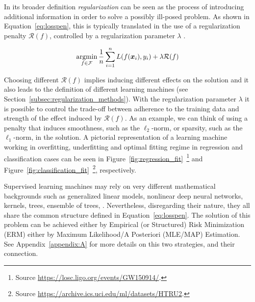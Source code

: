	    In its broader definition \textit{regularization} can be seen as the process of introducing additional information in order to solve a possibly ill-posed problem.
			As shown in Equation~\eqref{eq:losspen}, this is typically translated in the use of a regularization penalty $\mathcal{R}(f)$, controlled by a regularization parameter $\lambda$ \cite{tikhonov1963solution, evgeniou2000regularization}.

	     \begin{equation}\label{eq:losspen}
	    	\mathop{\mathrm{argmin}}\limits_{f \in \mathcal{F}} \frac{1}{n}\sum_{i=1}^n L(f(\bm{x}_i),y_i) + \lambda \mathcal{R}(f)
	    \end{equation}

			Choosing different $\mathcal{R}(f)$ implies inducing different effects on the solution and it also leads to the definition of different learning machines (see Section~\ref{subsec:regularization_methods}).
			With the regularization parameter $\lambda$ it is possible to control the trade-off between adherence to the training data and strength of the effect induced by $\mathcal{R}(f)$.
			As an example, we can think of using a penalty that induces smoothness, such as the $\ell_2$-norm, or sparsity, such as the $\ell_1$-norm, in the solution.
			A pictorial representation of a learning machine working in overfitting, underfitting and optimal fitting regime in regression and classification cases can be seen in
			Figure~\ref{fig:regression_fit}~\footnote{ Source \url{https://losc.ligo.org/events/GW150914/}.}
			and
		  Figure~\ref{fig:classification_fit}~\footnote{ Source \url{https://archive.ics.uci.edu/ml/datasets/HTRU2}.}, respectively.



	    Supervised learning machines may rely on very different mathematical backgrounds such as generalized linear models, nonlinear deep neural networks, kernels, trees, ensemble of trees, \etc. Nevertheless, disregarding their nature, they all share the common structure defined in Equation~\eqref{eq:losspen}.
	    The solution of this problem can be achieved either by Empirical (or Structured) Risk Minimization (\ac{ERM}) either by Maximum Likelihood/A Posteriori (\ac{MLE}/\ac{MAP}) Estimation. See Appendix~\ref{appendix:A} for more details on this two strategies, and their connection.

